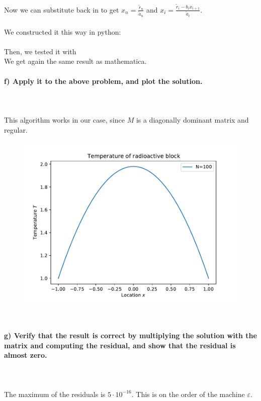     Now we can substitute back in to get
    $x_n = \frac{\tilde{r}_n}{\tilde{a}_n} $ and
    $x_i = \frac{\tilde{r}_{i} - b_{i} x_{i+1}}{\tilde{a}_{i}}$. \\
    \\
    We constructed it this way in python: \\
     \ \\
    Then, we tested it with
     \ \\
    We get again the same result as mathematica.

\newpage
\paragraph{
    f) Apply it to the above problem, and plot the solution.
} \ \\
    \\
    This algorithm works in our case, since $M$ is a diagonally
    dominant matrix and regular.
    \begin{figure}[h!]
        \centering
        \includegraphics[width=.7\textwidth]{../figures/Aufg1f.pdf}
    \end{figure} \ \\

\paragraph{
    g) Verify that the result is correct by multiplying the solution
    with the matrix and computing the residual, and show that the
    residual is almost zero.
} \ \\
    \\
    The maximum of the residuals is $5\cdot10^{-16}$. 
    This is on the order of the machine $\varepsilon$. \\
    

